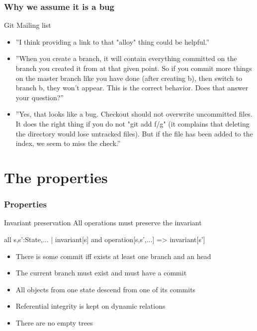 \documentclass{beamer}
\begin{document}
\begin{frame}
   \frametitle{Why we assume it is a bug} \pause
   \begin{block}{Git Mailing list}
      \footnotesize
      \begin{itemize}
         \item ''I think providing a link to that "alloy" thing could
         be helpful.'' \pause
         \item ''When you create a branch, it will contain everything
         committed on the branch you created it from at that given
         point. So if you commit more things on the master branch like
         you have done (after creating b), then switch to branch b,
         they won't appear. This is the correct behavior. Does that
         answer your question?'' \pause
         \item ''Yes, that looks like a bug. Checkout should not
         overwrite uncommitted files. It does the right thing if you
         do not "git add f/g" (it complains that deleting the
         directory would lose untracked files). But if the file has
         been added to the index, we seem to miss the check.''
      \end{itemize}
   \end{block}
\end{frame}

\section{The properties}
\begin{frame}[fragile]
   \frametitle{Properties}
   \begin{block}{Invariant preservation}
      All operations must preserve the invariant
   \end{block}
   \vspace{0.1in}
all s,s':State,... | invariant[s] and operation[s,s',...] => invariant[s'] \\
   \vspace{0.3in}
   \begin{itemize}
      \item There is some commit iff exists at least one branch and
      an head
      \item The current branch must exist and must have a commit
      \item All objects from one state descend from one of its commits
      \item Referential integrity is kept on dynamic relations
      \item There are no empty trees
   \end{itemize}

\end{frame}
\end{document}
